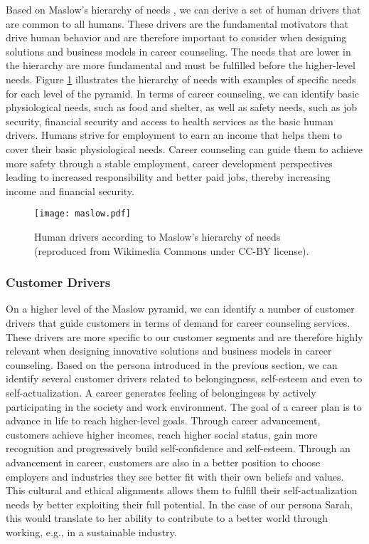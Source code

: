 Based on Maslow's hierarchy of needs \cite{maslowTheoryHumanMotivation1943}, we can derive a set of human drivers that
are common to all humans. These drivers are the fundamental motivators that drive human behavior and are therefore
important to consider when designing solutions and business models in career counseling. The needs that are lower in
the hierarchy are more fundamental and must be fulfilled before the higher-level needs.
Figure \ref{fig:maslow} illustrates the hierarchy of needs with examples of specific needs for each level of the pyramid.
In terms of career counseling, we can identify basic physiological needs, such as food and shelter, as well as safety needs,
such as job security, financial security and access to health services as the basic human drivers. Humans strive for employment
to earn an income that helps them to cover their basic physiological needs. Career counseling can guide them to achieve more
safety through a stable employment, career development perspectives leading to increased responsibility and better paid jobs,
thereby increasing income and financial security.

\begin{figure}[h!]
    \centering
    \caption{Human drivers according to Maslow's hierarchy of needs \cite{maslowTheoryHumanMotivation1943} (reproduced
    from Wikimedia Commons under CC-BY license).}
    \label{fig:maslow}
    \texttt{[image: maslow.pdf]}
\end{figure}

\subsubsection{Customer Drivers}

On a higher level of the Maslow pyramid, we can identify a number of customer drivers that guide customers in terms of
demand for career counseling services. These drivers are more specific to our customer segments and are therefore 
highly relevant when designing innovative solutions and business models in career counseling. Based on the persona 
introduced in the previous section, we can identify several customer drivers related to belongingness, self-esteem
and even to self-actualization. A career generates feeling of belongingess by actively participating in the society
and work environment. The goal of a career plan is to advance in life to reach higher-level goals. Through
career advancement, customers achieve higher incomes, reach higher social status, gain more recognition and progressively
build self-confidence and self-esteem. Through an advancement in career, customers are also in a better position to
choose employers and industries they see better fit with their own beliefs and values. This cultural and ethical
alignments allows them to fulfill their self-actualization needs by better exploiting their full potential. In
the case of our persona Sarah, this would translate to her ability to contribute to a better world through
working, e.g., in a sustainable industry.

